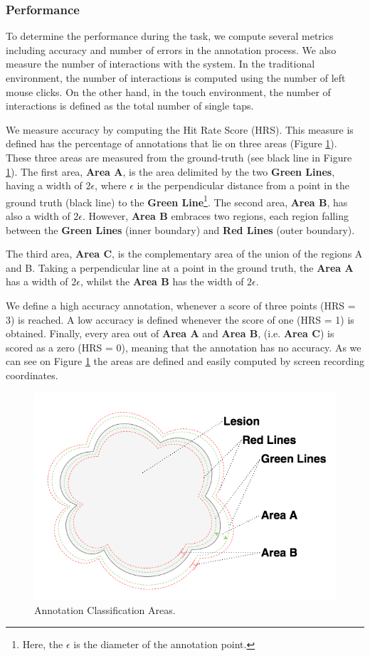 \documentclass{sigchi}
\begin{document}
\subsubsection{Performance}

To determine the performance during the task, we compute several metrics  including accuracy and number of errors in the annotation process. We also measure the number of interactions with the system. In the traditional environment, the number of interactions is computed using the number of left mouse clicks. On the other hand, in the touch environment, the number of interactions is defined as the total number of single taps.

We measure accuracy by computing the Hit Rate Score (HRS). This measure is defined has the percentage of annotations that lie on three areas (Figure \ref{fig:Fig7}). These three areas are measured from the ground-truth (see black line in Figure \ref{fig:Fig7}). The first area, \textbf{Area A}, is the area delimited by the two \textbf{Green Lines}, having a width of $2\epsilon$, where $\epsilon$ is the perpendicular distance from a point in the ground truth (black line) to the \textbf{Green Line}\footnote{Here, the $\epsilon$ is the diameter of the annotation point.}. The second area, \textbf{Area B}, has also a width of $2\epsilon$. However,  \textbf{Area B} embraces two regions, each region falling between the \textbf{Green Lines} (inner boundary) and \textbf{Red Lines} (outer boundary).

The third area, \textbf{Area C}, is the complementary area of the union of the regions A and B.  Taking a perpendicular line at a point in the ground truth, the \textbf{Area A} has a width of $2\epsilon$, whilst the \textbf{Area B} has the width of $2\epsilon$.

We define a high accuracy annotation, whenever a score of three points (HRS = 3) is reached. A low accuracy is defined whenever the score of one (HRS = 1) is obtained. Finally, every area out of \textbf{Area A} and \textbf{Area B}, (i.e.  \textbf{Area C}) is scored as a zero (HRS = 0), meaning that the annotation has no accuracy. As we can see on Figure \ref{fig:Fig7} the areas are defined and easily computed by screen recording coordinates.

\begin{figure}[!h]
\centering
\includegraphics[width=0.9\columnwidth]{mimbcd-ui_areas}
\caption{Annotation Classification Areas.}
\label{fig:Fig7}
\end{figure}
\end{document}
